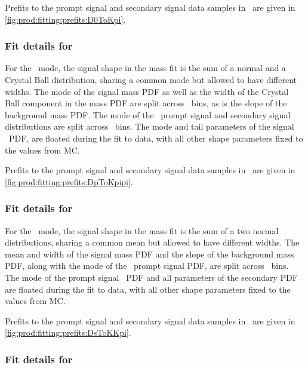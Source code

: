 Prefits to the prompt signal and secondary signal data samples in \lnipchisq\ 
are given in \cref{fig:prod:fitting:prefits:D0ToKpi}.

\subsubsection*{Fit details for \PDplus}
\label{chap:prod:fitting:details:DpToKpipi}

For the \DpToKpipi\ mode, the signal shape in the mass fit is the sum of a 
normal and a Crystal Ball distribution, sharing a common mode but allowed to 
have different widths.
The mode of the signal mass \ac{PDF} as well as the width of the Crystal Ball 
component in the mass \ac{PDF} are split across \pTy\ bins, as is the slope of 
the background mass \ac{PDF}.
The mode of the \lnipchisq\ prompt signal and secondary signal distributions 
are split across \pTy\ bins.
The mode and tail parameters of the signal \lnipchisq\ \ac{PDF}, are floated 
during the fit to data, with all other shape parameters fixed to the values 
from \ac{MC}.

Prefits to the prompt signal and secondary signal data samples in \lnipchisq\ 
are given in \cref{fig:prod:fitting:prefits:DpToKpipi}.

\subsubsection*{Fit details for \PDsplus}
\label{chap:prod:fitting:details:DsToKKpi}

For the \DspTophipi\ mode, the signal shape in the mass fit is the sum of a two 
normal distributions, sharing a common mean but allowed to have different 
widths.
The mean and width of the signal mass \ac{PDF} and the slope of the background 
mass \ac{PDF}, along with the mode of the \lnipchisq\ prompt signal \ac{PDF}, 
are split across \pTy\ bins.
The mode of the prompt signal \lnipchisq\ \ac{PDF} and all parameters of the 
secondary \ac{PDF} are floated during the fit to data, with all other shape 
parameters fixed to the values from \ac{MC}.

Prefits to the prompt signal and secondary signal data samples in \lnipchisq\ 
are given in \cref{fig:prod:fitting:prefits:DsToKKpi}.

\subsubsection*{Fit details for \PDstarp}
\label{chap:prod:fitting:details:DstToD0pi}

